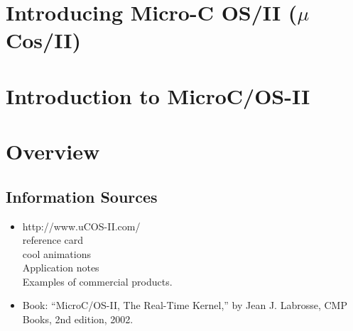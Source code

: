 %
%
%
%
%
%
%
%
%
%
%
%
%
%
%
%
\section*{\large\bf Introducing Micro-C OS/II ($\mu$Cos/II)}	%
%
%
%
%



\section*{Introduction to MicroC/OS-II  }
\section{Overview}
\subsection{Information Sources }
\begin{itemize}
\item http://www.uCOS-II.com/ \\
reference card\\
cool animations \\
Application notes \\
Examples of commercial products.
\item Book: ``MicroC/OS-II, The Real-Time Kernel,'' by
Jean J. Labrosse, CMP Books, 2nd edition, 2002.
\end{itemize}



